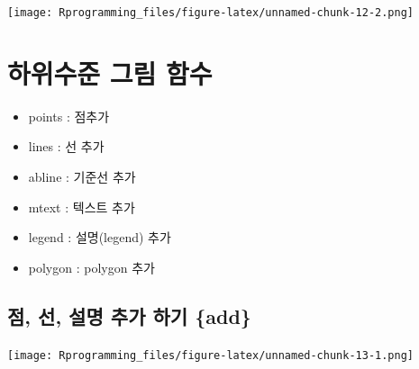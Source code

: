 \documentclass[10pt,]{krantz}
\makeatletter
\newenvironment{Shaded}{\begin{snugshade}}{\end{snugshade}}
\newcommand{\KeywordTok}[1]{\textcolor[rgb]{0.13,0.29,0.53}{\textbf{#1}}}
\newcommand{\DataTypeTok}[1]{\textcolor[rgb]{0.13,0.29,0.53}{#1}}
\newcommand{\DecValTok}[1]{\textcolor[rgb]{0.00,0.00,0.81}{#1}}
\newcommand{\StringTok}[1]{\textcolor[rgb]{0.31,0.60,0.02}{#1}}
\newcommand{\OperatorTok}[1]{\textcolor[rgb]{0.81,0.36,0.00}{\textbf{#1}}}
\newcommand{\NormalTok}[1]{#1}
\providecommand{\tightlist}{%
  \setlength{\itemsep}{0pt}\setlength{\parskip}{0pt}}
\newenvironment{kframe}{%
\medskip{}
\setlength{\fboxsep}{.8em}
 \def\at@end@of@kframe{}%
 \ifinner\ifhmode%
  \def\at@end@of@kframe{\end{minipage}}%
  \begin{minipage}{\columnwidth}%
 \fi\fi%
 \def\FrameCommand##1{\hskip\@totalleftmargin \hskip-\fboxsep
 \colorbox{shadecolor}{##1}\hskip-\fboxsep
     \hskip-\linewidth \hskip-\@totalleftmargin \hskip\columnwidth}%
 \MakeFramed {\advance\hsize-\width
   \@totalleftmargin\z@ \linewidth\hsize
   \@setminipage}}%
 {\par\unskip\endMakeFramed%
 \at@end@of@kframe}
\renewenvironment{Shaded}{\begin{kframe}}{\end{kframe}}
\theoremstyle{definition}
\theoremstyle{definition}
\theoremstyle{remark}
\makeatother
\begin{document}
\texttt{[image: Rprogramming\_files/figure-latex/unnamed-chunk-12-2.png]}

\section{하위수준 그림 함수}\label{lower}

\begin{itemize}
\tightlist
\item
  points : 점추가
\item
  lines : 선 추가
\item
  abline : 기준선 추가
\item
  mtext : 텍스트 추가
\item
  legend : 설명(legend) 추가
\item
  polygon : polygon 추가
\end{itemize}

\subsection{점, 선, 설명 추가 하기 \{add\}}\label{-----add}

\begin{Shaded}
\end{Shaded}

\texttt{[image: Rprogramming\_files/figure-latex/unnamed-chunk-13-1.png]}
\end{document}
